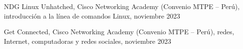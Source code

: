 \begin{scholarship}




  {NDG Linux Unhatched, Cisco Networking Academy (Convenio MTPE -- Perú),
   introducción a la línea de comandos Linux, noviembre 2023}

  {Get Connected, Cisco Networking Academy (Convenio MTPE -- Perú),
   redes, Internet, computadoras y redes sociales, noviembre 2023}












\end{scholarship}
